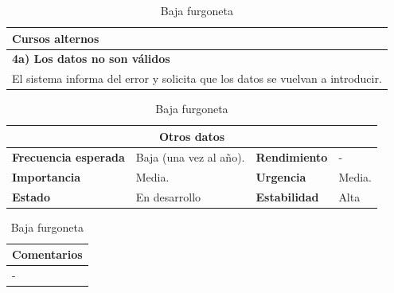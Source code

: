 \documentclass[12pt,spanish]{article}
\begin{document}
\begin{table}[H]
\vspace{1cm}

\begin{tabular}{|m{10pt}|m{7.15cm}|m{10pt}|m{7.15cm}|}
\hline
\multicolumn{4}{|m{16.2cm}|}{\textbf{Cursos alternos}} \\
\hline
\multicolumn{4}{|m{16.2cm}|}{\textbf{4a) Los datos no son válidos}} \\
\hline
\multicolumn{4}{|m{16.2cm}|}{El sistema informa del error y solicita que los datos se vuelvan a introducir.} \\
\hline
\end{tabular}

\vspace{1cm}

\begin{tabular}{|m{3.72cm}|m{3.72cm}|m{3.72cm}|m{3.72cm}|}
\hline
\multicolumn{4}{|c|}{\textbf{Otros datos}} \\
\hline
\textbf{Frecuencia esperada} & Baja (una vez al año). & \textbf{Rendimiento} & - \\
\hline
\textbf{Importancia} & Media. & \textbf{Urgencia} & Media. \\
\hline
\textbf{Estado} & En desarrollo & \textbf{Estabilidad} & Alta \\
\hline
\end{tabular}

\vspace{1cm}

\begin{tabular}{|m{16.2cm}|}
\hline
\textbf{Comentarios} \\
\hline
- \\
\hline
\end{tabular}

\caption{Baja furgoneta}

\end{table}

\end{document}
